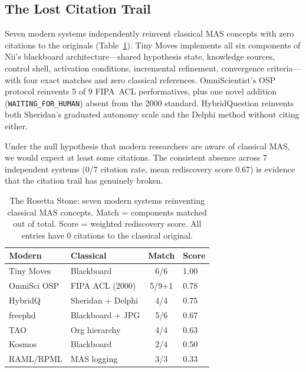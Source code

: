 \documentclass{article}
\begin{document}
\subsection{The Lost Citation Trail}
\label{sec:rosetta}

Seven modern systems independently reinvent classical MAS concepts with
zero citations to the originals (Table~\ref{tab:rosetta}). Tiny Moves
\cite{dobrowolska2026tinymoves} implements all six components of Nii's
 blackboard architecture---shared
hypothesis state, knowledge sources, control shell, activation
conditions, incremental refinement, convergence criteria---with four
exact matches and zero classical references.
OmniScientist's OSP protocol \cite{omniscientist2025} reinvents 5 of 9
FIPA~ACL performatives, plus one novel addition
(\texttt{WAITING\_FOR\_HUMAN}) absent from the 2000 standard.
HybridQuestion \cite{hybridquestion2025} reinvents both Sheridan's
 graduated autonomy scale and the
Delphi method \cite{dalkey1963delphi} without citing either.

Under the null hypothesis that modern researchers are aware of classical
MAS, we would expect at least some citations. The consistent absence
across 7 independent systems (0/7 citation rate, mean rediscovery score
0.67) is evidence that the citation trail has genuinely broken.

\begin{table}[t]
\centering
\small
\begin{tabular}{p{1.6cm}p{2.0cm}cp{0.5cm}}
\toprule
\textbf{Modern} & \textbf{Classical} & \textbf{Match} & \textbf{Score} \\
\midrule
Tiny Moves & Blackboard \cite{nii1986blackboard} & 6/6 & 1.00 \\
OmniSci OSP & FIPA ACL (2000) & 5/9+1 & 0.78 \\
HybridQ & Sheridan + Delphi & 4/4 & 0.75 \\
freephd & Blackboard + JPG & 5/6 & 0.67 \\
TAO & Org hierarchy & 4/4 & 0.63 \\
Kosmos & Blackboard & 2/4 & 0.50 \\
RAML/RPML & MAS logging & 3/3 & 0.33 \\
\bottomrule
\end{tabular}
\caption{The Rosetta Stone: seven modern systems reinventing classical
MAS concepts. Match = components matched out of total. Score =
weighted rediscovery score. All entries have 0 citations to the
classical original.}
\label{tab:rosetta}
\end{table}
\end{document}
